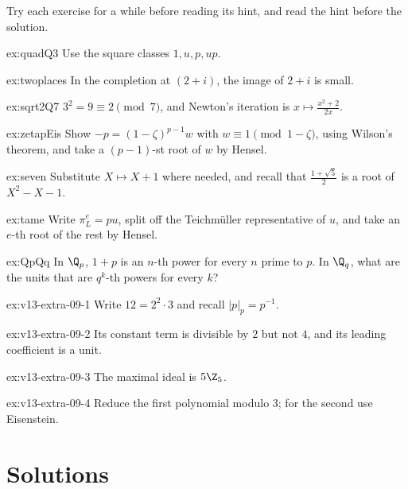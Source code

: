 Try each exercise for a while before reading its hint, and read the hint before the solution.

\begin{hint}{ex:quadQ3}
Use the square classes $1,u,p,up$.
\end{hint}
\begin{hint}{ex:twoplaces}
In the completion at $(2+i)$, the image of $2+i$ is small.
\end{hint}
\begin{hint}{ex:sqrt2Q7}
$3^2=9\equiv2\pmod 7$, and Newton's iteration is $x\mapsto\frac{x^2+2}{2x}$.
\end{hint}
\begin{hint}{ex:zetapEis}
Show $-p=(1-\zeta)^{p-1}w$ with $w\equiv1\pmod{1-\zeta}$, using Wilson's theorem, and take a $(p-1)$-st root of $w$ by Hensel.
\end{hint}
\begin{hint}{ex:seven}
Substitute $X\mapsto X+1$ where needed, and recall that $\frac{1+\sqrt5}2$ is a root of $X^2-X-1$.
\end{hint}
\begin{hint}{ex:tame}
Write $\pi_L^e=pu$, split off the Teichm\"uller representative of $u$, and take an $e$-th root of the rest by Hensel.
\end{hint}
\begin{hint}{ex:QpQq}
In $\Q_p$, $1+p$ is an $n$-th power for every $n$ prime to $p$. In $\Q_q$, what are the units that are $q^k$-th powers for every $k$?
\end{hint}

\begin{hint}{ex:v13-extra-09-1}
Write $12=2^2\cdot3$ and recall $|p|_p=p^{-1}$.
\end{hint}

\begin{hint}{ex:v13-extra-09-2}
Its constant term is divisible by $2$ but not $4$, and its leading coefficient is a unit.
\end{hint}

\begin{hint}{ex:v13-extra-09-3}
The maximal ideal is $5\Z_5$.
\end{hint}

\begin{hint}{ex:v13-extra-09-4}
Reduce the first polynomial modulo $3$; for the second use Eisenstein.
\end{hint}

\section{Solutions}


